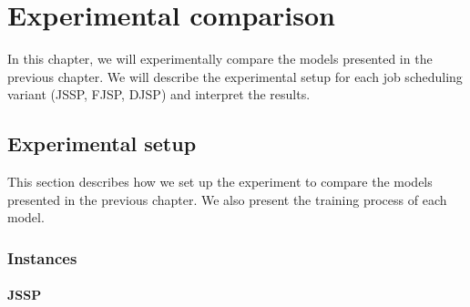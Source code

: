 \chapter{Experimental comparison}

In this chapter, we will experimentally compare the models presented in the previous chapter. We will describe the experimental setup for each job scheduling variant (JSSP, FJSP, DJSP) and interpret the results. 

\section{Experimental setup}

This section describes how we set up the experiment to compare the models presented in the previous chapter. We also present the training process of each model.

\subsection{Instances}

\subsubsection*{JSSP}

